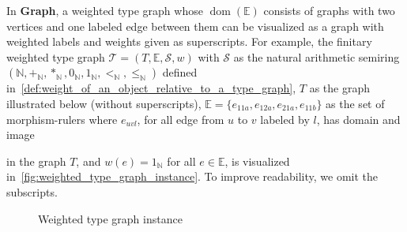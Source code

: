 \begin{example}
    \label{wf:example:weighted_type_graph}
     In \textbf{Graph}, a weighted type graph 
     whose $\operatorname{dom}(\mathbb{E})$ consists of graphs with two vertices and one labeled edge between them
     can be visualized as a graph with weighted labels and weights given as superscripts. For example, the finitary weighted type graph $\mathcal{T} = (T, \mathbb{E}, \mathcal{S}, w)$ with $\mathcal{S}$ as the natural arithmetic semiring $(\mathbb{N}, +_\mathbb{N}, *_\mathbb{N}, 0_\mathbb{N}, 1_\mathbb{N}, <_\mathbb{N},\leq_\mathbb{N})$ defined in~\autoref{def:weight_of_an_object_relative_to_a_type_graph},
     $T$ as the graph illustrated below (without superscripts), $\mathbb{E}=\{e_{11a},e_{12a},e_{21a},e_{11b}\}$ as the set of morphism-rulers where 
     $e_{uvl}$, for all edge from $u$ to $v$ labeled by $l$, has domain 
      and image 
     in the graph $T$,
    and $w(e) = 1_\mathbb{N}$ for all $e \in \mathbb{E}$, is visualized in~\autoref{fig:weighted_type_graph_instance}. To improve readability, we omit the subscripts.
    \begin{figure}[!ht]
        \centering
        \caption{Weighted type graph instance}
        \label{fig:weighted_type_graph_instance}
    \end{figure}
\end{example}